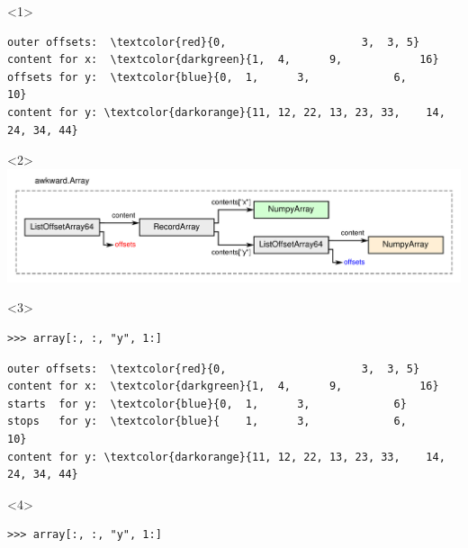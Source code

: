 \documentclass[aspectratio=169]{beamer}
\begin{document}
\begin{frame}[fragile]{}
\begin{onlyenv}<1>
\vspace{0.25 cm}
\begin{Verbatim}[commandchars=\\\{\}]
outer offsets:  \textcolor{red}{0,                     3,  3, 5}
content for x:  \textcolor{darkgreen}{1,  4,      9,            16}
offsets for y:  \textcolor{blue}{0,  1,      3,             6,            10}
content for y: \textcolor{darkorange}{11, 12, 22, 13, 23, 33,    14, 24, 34, 44}
\end{Verbatim}
\vspace{5 cm}
\end{onlyenv}\begin{onlyenv}<2>
\includegraphics[width=\linewidth]{img/example-hierarchy.pdf}
\vspace{5 cm}
\end{onlyenv}\begin{onlyenv}<3>
\vspace{0.25 cm}
\begin{verbatim}
>>> array[:, :, "y", 1:]
\end{verbatim}

\vspace{0.25 cm}
\begin{Verbatim}[commandchars=\\\{\}]
outer offsets:  \textcolor{red}{0,                     3,  3, 5}
content for x:  \textcolor{darkgreen}{1,  4,      9,            16}
starts  for y:  \textcolor{blue}{0,  1,      3,             6}
stops   for y:  \textcolor{blue}{    1,      3,             6,            10}
content for y: \textcolor{darkorange}{11, 12, 22, 13, 23, 33,    14, 24, 34, 44}
\end{Verbatim}
\vspace{5 cm}
\end{onlyenv}\begin{onlyenv}<4>
\vspace{0.25 cm}
\begin{verbatim}
>>> array[:, :, "y", 1:]
\end{verbatim}


\end{onlyenv}
\end{frame}
\end{document}
